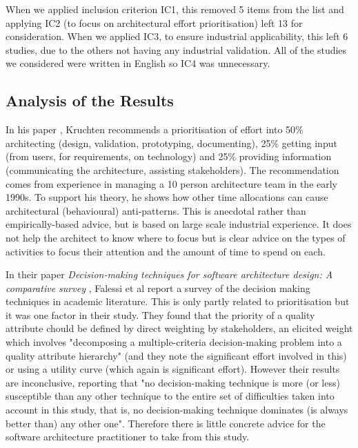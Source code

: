 When we applied inclusion criterion IC1, this removed 5 items from the list and applying IC2 (to focus on architectural effort prioritisation) left 13 for consideration.  When we applied IC3, to ensure industrial applicability, this left 6 studies, due to the others not having any industrial validation.  All of the studies we considered were written in English so IC4 was unnecessary.

\subsection{Analysis of the Results}

In his paper \emph{} \cite{kruchten2008-architectsdo}, Kruchten recommends a prioritisation of effort into 50\% architecting (design, validation, prototyping, documenting), 25\% getting input (from users, for requirements, on technology) and 25\% providing information (communicating the architecture, assisting stakeholders). The recommendation comes from experience in managing a 10 person architecture team in the early 1990s.  To support his theory, he shows how other time allocations can cause architectural (behavioural) anti-patterns.  This is anecdotal rather than empirically-based advice, but is based on large scale industrial experience.  It does not help the architect to know where to focus but is clear advice on the types of activities to focus their attention and the amount of time to spend on each.

In their paper \emph{Decision-making techniques for software architecture design: A comparative survey} \cite{falessi2011-archdecisionsurvey}, Falessi et al report a survey of the decision making techniques in academic literature.  This is only partly related to prioritisation but it was one factor in their study.  They found that the priority of a quality attribute chould be defined by direct weighting by stakeholders, an elicited weight which involves "decomposing a multiple-criteria decision-making problem into a quality attribute hierarchy" (and they note the significant effort involved in this) or using a utility curve (which again is significant effort).  However their results are inconclusive, reporting that "no decision-making technique is more (or less) susceptible than any other technique to the entire set of difficulties taken into account in this study, that is, no decision-making technique dominates (is always better than) any other one".  Therefore there is little concrete advice for the software architecture practitioner to take from this study.

